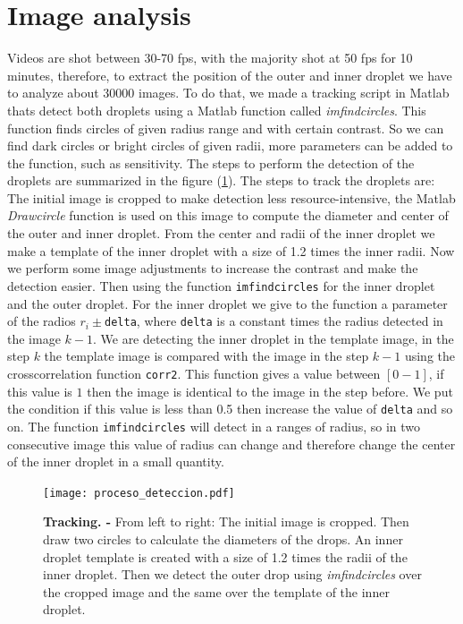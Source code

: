 \documentclass[%
10pt,
superscriptaddress,
twocolumn,
 amsmath,amssymb,
 aps,prx,
]{revtex4-2}
\begin{document}
\section{Image analysis}
\label{img.analisis}
Videos are shot between 30-70 fps, with the majority shot at 50 fps for 10 minutes, therefore, to extract the position of the outer and inner droplet we have to analyze about 30000 images. 
To do that, we made a tracking script in Matlab thats detect both droplets using a Matlab function  called \textit{imfindcircles}. This function finds circles of given radius range and with certain contrast. 
So we can find dark circles or bright circles of given radii, more parameters can be added to the function, such as sensitivity. The steps to perform the detection of the droplets are summarized in the figure (\ref{Deteccion}). The steps to track the droplets  are: The initial image is cropped  to make detection less resource-intensive, the Matlab \textit{Drawcircle} function is used on this image  to compute the diameter and center of the outer and inner  droplet. From the center and radii of the inner droplet we make a template of the inner droplet with a size of  1.2 times the  inner radii. Now we perform some image adjustments to increase the contrast  and  make the detection easier.  Then using the function \texttt{imfindcircles} for the inner droplet and the outer droplet. For the inner droplet we give to the function a parameter of the radios  $r_{i} \pm$\texttt{delta}, where \texttt{delta} is a constant times the radius detected in the image $k-1$.  We are detecting the inner droplet in the template image, in the step $k$ the template image is compared with the image in the step $k-1$ using the crosscorrelation function \texttt{corr2}.   This function gives a value between $[0-1]$, if this value is $1$ then the image is identical to the image  in the step before. We put the condition if this value is less than 0.5 then increase the value of  \texttt{delta} and so on. The function \texttt{imfindcircles} will detect in a ranges of radius, so in two consecutive image this value of radius can change and therefore change the center of the inner droplet in a small quantity. 

\begin{figure}[b!]
	\begin{center}
		\texttt{[image: proceso\_deteccion.pdf]}	
\caption[Detection]{\small{\textbf{Tracking. -} From left to right: The initial image is cropped.  Then draw two circles to calculate the diameters of the drops. An inner droplet template is created with a size of 1.2 times the radii of the inner droplet. Then we detect the outer drop using \textit{imfindcircles} over the cropped image and the same over the template of the inner  droplet.   }}
		\label{Deteccion}
	\end{center}
\end{figure}
\end{document}
